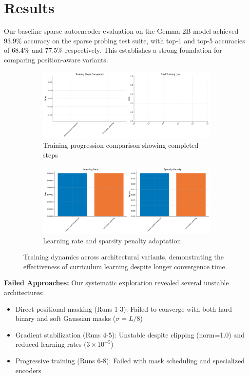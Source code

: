 \documentclass{article} %
\begin{document}
\section{Results}
\label{sec:results}

Our baseline sparse autoencoder evaluation on the Gemma-2B model achieved 93.9\% accuracy on the sparse probing test suite, with top-1 and top-5 accuracies of 68.4\% and 77.5\% respectively. This establishes a strong foundation for comparing position-aware variants.

\begin{figure}[h]
    \centering
    \begin{subfigure}{0.49\textwidth}
        \includegraphics[width=\textwidth]{training_progression.png}
        \caption{Training progression comparison showing completed steps}
        \label{fig:training-prog}
    \end{subfigure}
    \hfill
    \begin{subfigure}{0.49\textwidth}
        \includegraphics[width=\textwidth]{hyperparameters.png}
        \caption{Learning rate and sparsity penalty adaptation}
        \label{fig:hyperparams}
    \end{subfigure}
    \caption{Training dynamics across architectural variants, demonstrating the effectiveness of curriculum learning despite longer convergence time.}
    \label{fig:results}
\end{figure}

\textbf{Failed Approaches:} Our systematic exploration revealed several unstable architectures:
\begin{itemize}
    \item Direct positional masking (Runs 1-3): Failed to converge with both hard binary and soft Gaussian masks ($\sigma = L/8$)
    \item Gradient stabilization (Runs 4-5): Unstable despite clipping (norm=1.0) and reduced learning rates ($3\times10^{-5}$)
    \item Progressive training (Runs 6-8): Failed with mask scheduling and specialized encoders
\end{itemize}
\end{document}
